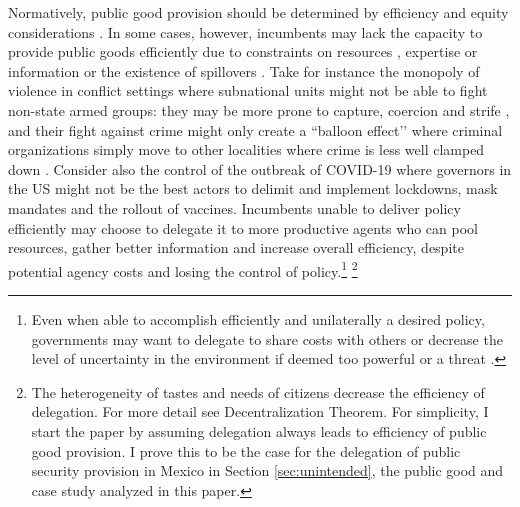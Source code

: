 \documentclass[12pt]{amsart}
\numberwithin{equation}{section}
\theoremstyle{definition}
\theoremstyle{definition}
\theoremstyle{definition}
\begin{document}
Normatively, public good provision should be determined by efficiency and equity considerations \citep{oates_1972, Musgrave_1959, Musgrave_1983, gramlich_1977}. In some cases, however, incumbents may lack the capacity to provide public goods efficiently due to constraints on resources \citep{Moravcsik_2000}, expertise or information \citet{Rodrick_1996} or the existence of spillovers \citep{oates_1972,  Besley_case_1995}. Take for instance the monopoly of violence in conflict settings where subnational units might not be able to fight non-state armed groups: they may be more prone to capture, coercion and strife \citet{chacon_2018}, and their fight against crime might only create a ``balloon effect’’ where criminal organizations simply move to other localities where crime is less well clamped down \citep{shirk_wallman_2015}. Consider also the control of the outbreak of COVID-19 where governors in the US might not be the best actors to delimit and implement lockdowns, mask mandates and the rollout of vaccines. Incumbents unable to deliver policy efficiently may choose to delegate it to more productive agents who can pool resources, gather better information and increase overall efficiency, despite potential agency costs and losing the control of policy.\footnote{Even when able to accomplish efficiently and unilaterally a desired policy, governments may want to delegate to share costs with others \citep{Moravcsik_2000} or decrease the level of uncertainty in the environment if deemed too powerful or a threat \citep{lake_2009, milner_2011}.} \footnote{The heterogeneity of tastes and needs of citizens decrease the efficiency of delegation. For more detail see \citet{oates_1972} Decentralization Theorem. For simplicity, I start the paper by assuming delegation always leads to efficiency of public good provision. I prove this to be the case for the delegation of public security provision in Mexico in Section \ref{sec:unintended}, the public good and case study analyzed in this paper.} 
         
\end{document}
